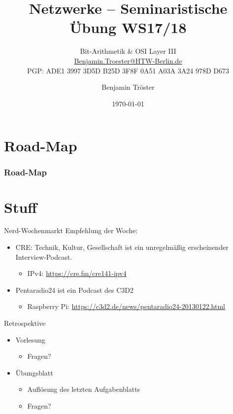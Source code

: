 \documentclass[xcolor=dvipsnames]{beamer}
\begin{document}

\title{Netzwerke -- Seminaristische Übung WS17/18}
\subtitle{Bit-Arithmetik \& OSI Layer III\\
		\href{mailto:Benjamin.Troester@HTW-Berlin.de}{Benjamin.Troester@HTW-Berlin.de}\\
		PGP: ADE1 3997 3D5D B25D 3F8F 0A51 A03A 3A24 978D D673 }
\author{Benjamin Tröster}

\date{\today}

\begin{frame}
\titlepage
\end{frame}

\section*{Road-Map}
\begin{frame}
\frametitle{Road-Map}
\begin{multicols}{2}
  \tableofcontents
\end{multicols}
\end{frame}

\section*{Stuff}
\begin{frame}{Nerd-Wochenmarkt}
Empfehlung der Woche:
\begin{itemize}
	\item CRE: Technik, Kultur, Gesellschaft ist ein unregelmäßig erscheinender Interview-Podcast.
	\begin{itemize}
		\item IPv4: \url{https://cre.fm/cre141-ipv4} 
	\end{itemize}
	\item Pentaradio24 ist ein Podcast des C3D2
	\begin{itemize}
		\item Raspberry Pi: \url{https://c3d2.de/news/pentaradio24-20130122.html} 
	\end{itemize}
\end{itemize}
\end{frame}

\begin{frame}{Retrospektive}
\begin{itemize}
	\item Vorlesung
	\begin{itemize}
		\item Fragen?
	\end{itemize}
	\item Übungsblatt
	\begin{itemize}
		\item Auflösung des letzten Aufgabenblatts
		\item Fragen?
	\end{itemize}
\end{itemize}
\end{frame}
\end{document}

